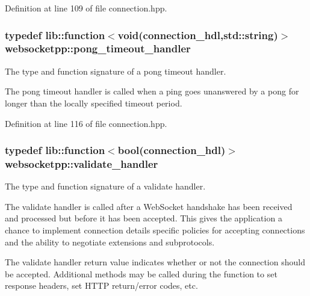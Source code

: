Definition at line 109 of file connection.\+hpp.

\subsubsection[{\texorpdfstring{pong\+\_\+timeout\+\_\+handler}{pong\_timeout\_handler}}]{\setlength{\rightskip}{0pt plus 5cm}typedef lib\+::function$<$void({\bf connection\+\_\+hdl},std\+::string)$>$ {\bf websocketpp\+::pong\+\_\+timeout\+\_\+handler}}\hypertarget{namespacewebsocketpp_a2c5925a111b9e553efebea35d5ea155f}{}\label{namespacewebsocketpp_a2c5925a111b9e553efebea35d5ea155f}


The type and function signature of a pong timeout handler. 

The pong timeout handler is called when a ping goes unanswered by a pong for longer than the locally specified timeout period. 

Definition at line 116 of file connection.\+hpp.

\subsubsection[{\texorpdfstring{validate\+\_\+handler}{validate\_handler}}]{\setlength{\rightskip}{0pt plus 5cm}typedef lib\+::function$<$bool({\bf connection\+\_\+hdl})$>$ {\bf websocketpp\+::validate\+\_\+handler}}\hypertarget{namespacewebsocketpp_ae28f3fed86a59b1998746694f3d4edbd}{}\label{namespacewebsocketpp_ae28f3fed86a59b1998746694f3d4edbd}


The type and function signature of a validate handler. 

The validate handler is called after a Web\+Socket handshake has been received and processed but before it has been accepted. This gives the application a chance to implement connection details specific policies for accepting connections and the ability to negotiate extensions and subprotocols.

The validate handler return value indicates whether or not the connection should be accepted. Additional methods may be called during the function to set response headers, set H\+T\+TP return/error codes, etc. 

